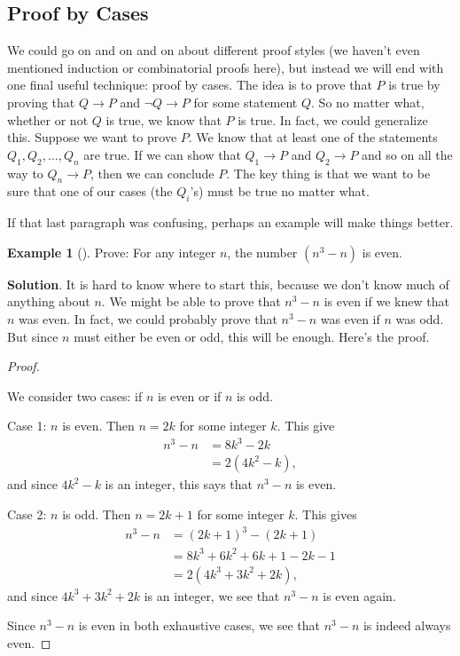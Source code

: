 \documentclass[10pt,]{book}
\theoremstyle{plain}
\theoremstyle{definition}
\theoremstyle{definition}
\newtheorem{example}[theorem]{Example}
\theoremstyle{definition}
\theoremstyle{definition}
\numberwithin{equation}{chapter}
\def\imp{\rightarrow}
\newcommand{\amp}{&}
\begin{document}
\subsection[{Proof by Cases}]{Proof by Cases}\label{subsection-43}
\hypertarget{p-1991}{}%
%
\par
\hypertarget{p-1992}{}%
We could go on and on and on about different proof styles (we haven't even mentioned induction or combinatorial proofs here), but instead we will end with one final useful technique: proof by cases. The idea is to prove that \(P\) is true by proving that \(Q \imp P\) and \(\neg Q \imp P\) for some statement \(Q\). So no matter what, whether or not \(Q\) is true, we know that \(P\) is true. In fact, we could generalize this. Suppose we want to prove \(P\). We know that at least one of the statements \(Q_1, Q_2, \ldots, Q_n\) are true. If we can show that \(Q_1 \imp P\) and \(Q_2 \imp P\) and so on all the way to \(Q_n \imp P\), then we can conclude \(P\). The key thing is that we want to be sure that one of our cases (the \(Q_i\)'s) must be true no matter what.%
\par
\hypertarget{p-1993}{}%
If that last paragraph was confusing, perhaps an example will make things better.%
\begin{example}[]\label{example-73}
\hypertarget{p-1994}{}%
Prove: For any integer \(n\), the number \((n^3 -n)\) is even.%
\par\smallskip%
\noindent\textbf{Solution}.\hypertarget{solution-188}{}\quad%
\hypertarget{p-1995}{}%
It is hard to know where to start this, because we don't know much of anything about \(n\). We might be able to prove that \(n^3 - n\) is even if we knew that \(n\) was even. In fact, we could probably prove that \(n^3-n\) was even if \(n\) was odd. But since \(n\) must either be even or odd, this will be enough. Here's the proof.%
\begin{proof}\hypertarget{proof-29}{}
\hypertarget{p-1996}{}%
We consider two cases: if \(n\) is even or if \(n\) is odd.%
\par
\hypertarget{p-1997}{}%
Case 1: \(n\) is even. Then \(n = 2k\) for some integer \(k\). This give%
\begin{align*}
n^3 - n \amp = 8k^3 - 2k\\
\amp = 2(4k^2 - k),
\end{align*}
and since \(4k^2 - k\) is an integer, this says that \(n^3-n\) is even.%
\par
\hypertarget{p-1998}{}%
Case 2: \(n\) is odd. Then \(n = 2k+1\) for some integer \(k\). This gives%
\begin{align*}
n^3 - n \amp = (2k+1)^3 - (2k+1)\\
\amp = 8k^3 + 6k^2 + 6k + 1 - 2k - 1\\
\amp = 2(4k^3 + 3k^2 + 2k),
\end{align*}
and since \(4k^3 + 3k^2 + 2k\) is an integer, we see that \(n^3 - n\) is even again.%
\par
\hypertarget{p-1999}{}%
Since \(n^3 - n\) is even in both exhaustive cases, we see that \(n^3 - n\) is indeed always even.%
\end{proof}
\end{example}
\end{document}

